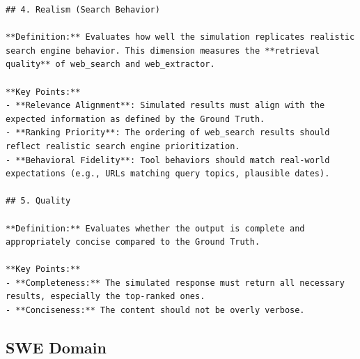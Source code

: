 \begin{lstlisting}
## 4. Realism (Search Behavior)

**Definition:** Evaluates how well the simulation replicates realistic search engine behavior. This dimension measures the **retrieval quality** of web_search and web_extractor.

**Key Points:**
- **Relevance Alignment**: Simulated results must align with the expected information as defined by the Ground Truth.
- **Ranking Priority**: The ordering of web_search results should reflect realistic search engine prioritization.
- **Behavioral Fidelity**: Tool behaviors should match real-world expectations (e.g., URLs matching query topics, plausible dates).

## 5. Quality

**Definition:** Evaluates whether the output is complete and appropriately concise compared to the Ground Truth.

**Key Points:**
- **Completeness:** The simulated response must return all necessary results, especially the top-ranked ones.
- **Conciseness:** The content should not be overly verbose.
\end{lstlisting}

\subsection{SWE Domain}
\label{sec:appendix:judge_swe}

